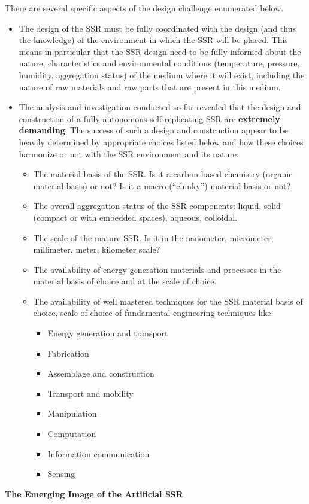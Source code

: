 \documentclass[letterpaper]{article}
\begin{document}
\bigskip

There are several specific aspects of the design challenge enumerated
below.


\bigskip

\begin{itemize}
\item The design of the SSR must be fully coordinated with the design
(and thus the knowledge) of the environment in which the SSR will be
placed. This means in particular that the SSR design need to be fully
informed about the nature, characteristics and environmental conditions
(temperature, pressure, humidity, aggregation status) of the medium
where it will exist, including the nature of raw materials and raw
parts that are present in this medium.
\item The analysis and investigation conducted so far revealed that the
design and construction of a fully autonomous self-replicating SSR are
\textbf{extremely demanding}. The success of such a design and
construction appear to be heavily determined by appropriate choices
listed below and how these choices harmonize or not with the SSR
environment and its nature:

\begin{itemize}
\item The material basis of the SSR. Is it a carbon-based chemistry
(organic material basis) or not?  Is it a macro (“clunky”) material
basis or not?
\item The overall aggregation status of the SSR components: liquid,
solid (compact or with embedded spaces), aqueous, colloidal.
\item The scale of the mature SSR. Is it in the nanometer, micrometer,
millimeter, meter, kilometer scale?
\item The availability of energy generation materials and processes in
the material basis of choice and at the scale of choice.
\item The availability of well mastered techniques for the SSR material
basis of choice, scale of choice of fundamental engineering techniques
like:

\begin{itemize}
\item Energy generation and transport
\item Fabrication
\item Assemblage and construction
\item Transport and mobility
\item Manipulation
\item Computation
\item Information communication
\item Sensing
\end{itemize}
\end{itemize}
\end{itemize}
{\bfseries
\hypertarget{RefHeading3150306210128}{}The Emerging Image of the
Artificial SSR}
\end{document}
